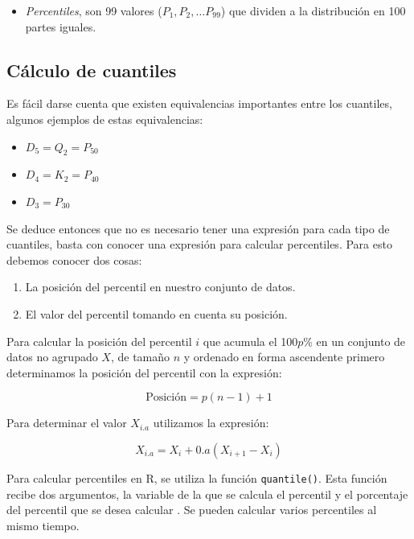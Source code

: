 \documentclass[letterpaper,]{book}
\providecommand{\tightlist}{%
  \setlength{\itemsep}{0pt}\setlength{\parskip}{0pt}}
\begin{document}
\begin{itemize}
\tightlist
\item
  \emph{Percentiles}, son 99 valores (\(P_1, P_2, \ldots P_{99}\)) que dividen a la distribución en 100 partes iguales.
\end{itemize}

\hypertarget{calculo-de-cuantiles}{%
\subsection{Cálculo de cuantiles}\label{calculo-de-cuantiles}}

Es fácil darse cuenta que existen equivalencias importantes entre los cuantiles, algunos ejemplos de estas equivalencias:

\begin{itemize}
\tightlist
\item
  \(D_5=Q_2=P_{50}\)
\item
  \(D_4=K_2=P_{40}\)
\item
  \(D_3=P_{30}\)
\end{itemize}

Se deduce entonces que no es necesario tener una expresión para cada tipo de cuantiles, basta con conocer una expresión para calcular percentiles. Para esto debemos conocer dos cosas:

\begin{enumerate}
\def\labelenumi{\arabic{enumi}.}
\tightlist
\item
  La posición del percentil en nuestro conjunto de datos.
\item
  El valor del percentil tomando en cuenta su posición.
\end{enumerate}

Para calcular la posición del percentil \(i\) que acumula el 100\(p\)\% en un conjunto de datos no agrupado \(X\), de tamaño \(n\) y ordenado en forma ascendente primero determinamos la posición del percentil con la expresión:

\begin{equation} 
  \text{Posición} = p(n-1)+1
  \label{eq:posperc}
\end{equation}

Para determinar el valor \(X_{i.a}\) utilizamos la expresión:

\begin{equation} 
  X_{i.a}=X_{i}+0.a(X_{i+1}-X_{i})
  \label{eq:valperc}
\end{equation}

Para calcular percentiles en R, se utiliza la función \texttt{quantile()}. Esta función recibe dos argumentos, la variable de la que se calcula el percentil y el porcentaje del percentil que se desea calcular \citep{verzani2014}. Se pueden calcular varios percentiles al mismo tiempo.
\end{document}
